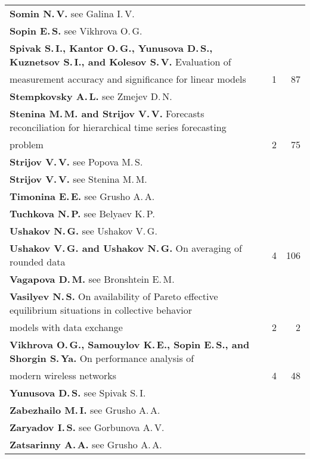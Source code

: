 {\begin{tabular}{p{397pt}rr}
\textbf{Somin N.\,V.} see Galina I.\,V.&&\\
\textbf{Sopin E.\,S.} see Vikhrova O.\,G.&&\\
\textbf{Spivak S.\,I., Kantor O.\,G., Yunusova D.\,S., Kuznetsov S.\,I., and
Kolesov S.\,V.} Evaluation of\linebreak
\\[-12pt]
\hspace*{21pt}measurement accuracy and significance for linear
models&1&87\\
\textbf{Stempkovsky A.\,L.} see Zmejev D.\,N.&&\\
\textbf{Stenina M.\,M. and Strijov V.\,V.} Forecasts reconciliation for
hierarchical time series forecasting\linebreak
\\[-12pt]
\hspace*{21pt}problem&2&75\\
\textbf{Strijov V.\,V.} see Popova M.\,S.&&\\
\textbf{Strijov V.\,V.} see Stenina M.\,M.&&\\
\textbf{Timonina E.\,E.} see Grusho A.\,A.&&\\
\textbf{Tuchkova N.\,P.} see Belyaev K.\,P.&&\\
\textbf{Ushakov N.\,G.} see Ushakov V.\,G.&&\\
\textbf{Ushakov V.\,G. and Ushakov N.\,G.} On averaging of rounded data&4&106\\
\textbf{Vagapova D.\,M.} see Bronshtein E.\,M.&&\\
\textbf{Vasilyev N.\,S.} On availability of Pareto effective equilibrium situations
in collective behavior\linebreak
\\[-12pt]
\hspace*{21pt}models with data exchange&2&2\\
\textbf{Vikhrova O.\,G., Samouylov K.\,E., Sopin E.\,S., and Shorgin S.\,Ya.} On
performance analysis of\linebreak
\\[-12pt]
\hspace*{21pt}modern wireless networks&4&48\\
\textbf{Yunusova D.\,S.} see Spivak S.\,I.&&\\
\textbf{Zabezhailo M.\,I.} see Grusho A.\,A.&&\\
\textbf{Zaryadov I.\,S.} see Gorbunova A.\,V.&&\\
\textbf{Zatsarinny A.\,A.} see Grusho A.\,A.&&\\

\end{tabular}}
